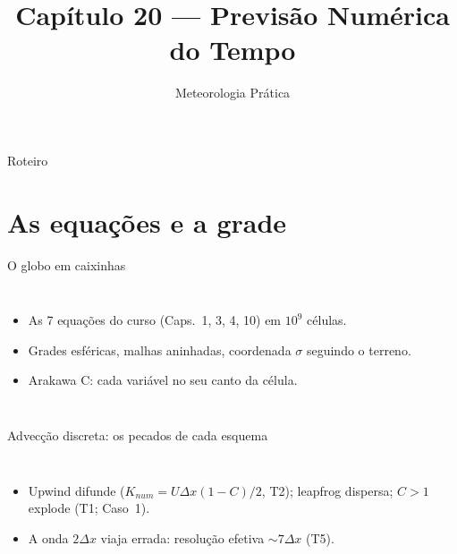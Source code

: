 \documentclass[aspectratio=169,11pt]{beamer}
\title[Cap. 20 --- Previsão Numérica]{Capítulo 20 --- Previsão Numérica
do Tempo}
\subtitle{Meteorologia Prática}
\author{}
\date{}
\begin{document}
\begin{frame}
  \titlepage
  \vfill
  \atribuicao
\end{frame}

\begin{frame}{Roteiro}
  \tableofcontents
\end{frame}

\section{As equações e a grade}

\begin{frame}{O globo em caixinhas}
  \begin{columns}
    \begin{itemize}
      \item As 7 equações do curso (Caps.~1, 3, 4, 10) em $10^9$
            células.
      \item Grades esféricas, malhas aninhadas, coordenada $\sigma$
            seguindo o terreno.
      \item Arakawa C: cada variável no seu canto da célula.
    \end{itemize}
  \end{columns}
\end{frame}

\begin{frame}{Advecção discreta: os pecados de cada esquema}
  \begin{columns}
    \vspace{0.4em}
    \begin{itemize}
      \item Upwind difunde ($K_{num} = U\Delta x(1-C)/2$, T2);
            leapfrog dispersa; $C>1$ explode (T1; Caso~1).
      \item A onda $2\Delta x$ viaja errada: resolução efetiva
            $\sim 7\Delta x$ (T5).
    \end{itemize}
  \end{columns}
\end{frame}
\end{document}
